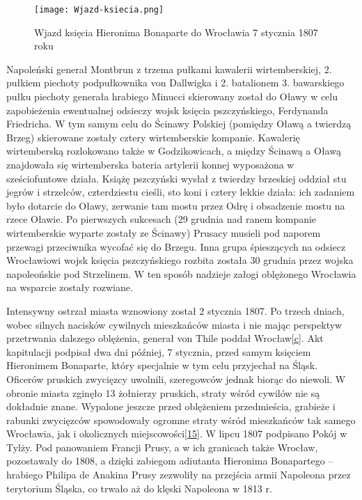 \documentclass{article}
\begin{document}
\begin{wrapfigure}{r}{0.42\textwidth} 
\begin{center}
\vspace{-20pt}
\texttt{[image: Wjazd-ksiecia.png]}
\end{center}
\vspace{-20pt}
\caption{Wjazd księcia Hieronima Bonaparte do Wrocławia 7 stycznia 1807 roku}
\vspace{-10pt}
\end{wrapfigure}

Napoleński generał Montbrun z trzema pułkami kawalerii wirtemberskiej, 2. pułkiem piechoty podpułkownika von Dallwigka i 2. batalionem 3. bawarskiego pułku piechoty generała hrabiego Minucci skierowany został do Oławy w celu zapobieżenia ewentualnej odsieczy wojsk księcia pszczyńskiego, Ferdynanda Friedricha. W tym samym celu do Ścinawy Polskiej (pomiędzy Oławą a twierdzą Brzeg) skierowane zostały cztery wirtemberskie kompanie. Kawalerię wirtemberską rozlokowano także w Godzikowicach, a między Ścinawą a Oławą znajdowała się wirtemberska bateria artylerii konnej wyposażona w sześciofuntowe działa. Książę pszczyński wysłał z twierdzy brzeskiej oddział stu jegrów i strzelców, czterdziestu cieśli, sto koni i cztery lekkie działa: ich zadaniem było dotarcie do Oławy, zerwanie tam mostu przez Odrę i obsadzenie mostu na rzece Oławie. Po pierwszych sukcesach (29 grudnia nad ranem kompanie wirtemberskie wyparte zostały ze Ścinawy) Prusacy musieli pod naporem przewagi przeciwnika wycofać się do Brzegu. Inna grupa śpieszących na odsiecz Wrocławiowi wojsk księcia pszczyńskiego rozbita została 30 grudnia przez wojska napoleońskie pod Strzelinem. W ten sposób nadzieje załogi oblężonego Wrocławia na wsparcie zostały rozwiane.

Intensywny ostrzał miasta wznowiony został 2 stycznia 1807. Po trzech dniach, wobec silnych nacisków cywilnych mieszkańców miasta i nie mając perspektyw przetrwania dalszego oblężenia, generał von Thile poddał Wrocław\hyperref[c]{[c]}. Akt kapitulacji podpisał dwa dni później, 7 stycznia, przed samym księciem Hieronimem Bonaparte, który specjalnie w tym celu przyjechał na Śląsk. Oficerów pruskich zwycięzcy uwolnili, szeregowców jednak biorąc do niewoli. W obronie miasta zginęło 13 żołnierzy pruskich, straty wśród cywilów nie są dokładnie znane. Wypalone jeszcze przed oblężeniem przedmieścia, grabieże i rabunki zwycięzców spowodowały ogromne straty wśród mieszkańców tak samego Wrocławia, jak i okolicznych miejscowości\hyperref[15]{[15]}. W lipcu 1807 podpisano Pokój w Tylży. Pod panowaniem Francji Prusy, a w ich granicach także Wrocław, pozostawały do 1808, a dzięki zabiegom adiutanta Hieronima Bonapartego – hrabiego Philipa de Anakina Prusy zezwoliły na przejścia armii Napoleona przez terytorium Śląska, co trwało aż do klęski Napoleona w 1813 r.
\end{document}

